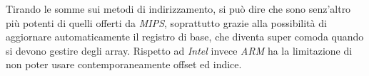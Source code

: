 \documentclass[class=book, crop=false, oneside]{standalone}
\begin{document}
Tirando le somme sui metodi di indirizzamento, si può dire che sono senz'altro più potenti di quelli offerti da \emph{MIPS}, soprattutto grazie alla possibilità di aggiornare automaticamente il registro di base, che diventa super comoda quando si devono gestire degli array. Rispetto ad \emph{Intel} invece \emph{ARM} ha la limitazione di non poter usare contemporaneamente offset ed indice.
\end{document}
